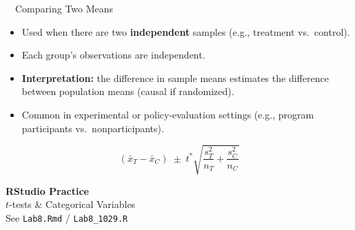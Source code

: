 \documentclass[aspectratio=169,11pt]{beamer}
\begin{document}
\begin{frame}{\ \ Comparing Two Means}
  \begin{itemize}
    \item Used when there are two \textbf{independent} samples (e.g., treatment vs.\ control).
    \item Each group's observations are independent.
    \item \textbf{Interpretation:} the difference in sample means estimates the
          difference between population means (causal if randomized).
    \item Common in experimental or policy-evaluation settings (e.g., program
          participants vs.\ nonparticipants).
  \end{itemize}
  \vspace{0.6em}
  \begin{keybox}
    \begin{equation*}
      (\bar{x}_T - \bar{x}_C) \;\pm\; t^* \sqrt{\frac{s_T^2}{n_T} + \frac{s_C^2}{n_C}}
    \end{equation*}
  \end{keybox}
\end{frame}

{
\begin{frame}
  \vfill
  \centering
  {\color{qrnavy}\Huge\bfseries RStudio Practice}\\[0.8em]
  {\color{qrblue}\large $t$-tests \& Categorical Variables}\\[0.4em]
  {\color{qrgray} See \texttt{Lab8.Rmd} / \texttt{Lab8\_1029.R}}
  \vfill
\end{frame}
}
\end{document}
